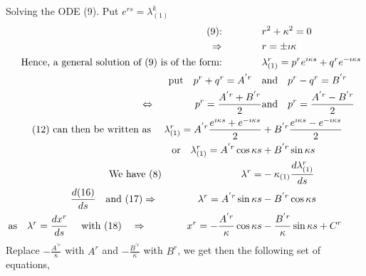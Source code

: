 Solving the ODE (9). Put $ e^{rs} = \lambda_{(1)}^k$
\begin{align}
\text{(9):}\quad\quad\quad\quad&  r^2 + \kappa^2 = 0\\
\Rightarrow \quad\quad\quad\quad & r = \pm \imath \kappa\\
\text{Hence, a general solution of (9) is of the form:} \quad\quad\quad\quad & \lambda_{(1)}^r = p^r e^{ \imath \kappa s}  + q^r e^{ -\imath \kappa s}\\
\text{put}\quad  p^r+q^r = A^{'r}\quad &\text{and}\quad p^r-q^r = B^{'r}\\
\Leftrightarrow \quad\quad\quad\quad p^r = \frac{A^{'r}+B^{'r}}{2} &\text{and}\quad p^r=\frac{A^{'r}-B^{'r}}{2}\\
\text{(12) can then be written as }\quad  \lambda_{(1)}^r = A^{'r}\frac{ e^{ \imath \kappa s}+  e^{ -\imath \kappa s}}{2} & + B^{'r}\frac{ e^{ \imath \kappa s}- e^{ -\imath \kappa s}}{2}\\
\text{or}\quad  \lambda_{(1)}^r = A^{'r}\cos \kappa s & + B^{'r}\sin \kappa s\\
\text{We have (8)}\quad\quad\quad\quad \quad\quad\quad\quad  \lambda^r =  & -  \kappa_{(1)} \dv{\lambda_{(1)}^r}{ s} \\
\dv{(16)}{s}\quad\text{and (17)}\Rightarrow\quad\quad\quad\quad \lambda^r =  A^{'r}\sin \kappa s & - B^{'r}\cos \kappa s\\
\text{as}\quad \lambda^r = \dv{x^r}{s}\quad\text{ with (18)}\quad \Rightarrow \quad\quad\quad\quad x^r = - \frac{A^{'r}}{\kappa}\cos \kappa s &  - \frac{B^{'r}}{\kappa}\sin \kappa s + C^r\\
\end{align}
Replace $- \frac{A^{'r}}{\kappa}$ with $A^{r}$ and $- \frac{B^{'r}}{\kappa}$ with $B^{r}$, we get then the following set of equations,

